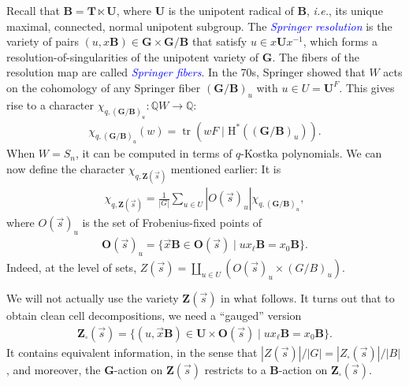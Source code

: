 \documentclass[submission]{FPSAC2025}
\newcommand{\dfemph}[1]{\textcolor{blue}{\emph{#1}}}
\DeclareMathOperator{\tr}{tr}
\newcommand{\CharQ}[1]{\chi_{q, #1}}
\begin{document}
Recall that $\mathbf{B} = \mathbf{T} \ltimes \mathbf{U}$, where $\mathbf{U}$ is the unipotent radical of $\mathbf{B}$, \emph{i.e.}, its unique maximal, connected, normal unipotent subgroup.
The \dfemph{Springer resolution} is the variety of pairs $(u, x\mathbf{B}) \in \mathbf{G} \times \mathbf{G}/\mathbf{B}$ that satisfy $u \in x\mathbf{U}x^{-1}$, which forms a resolution-of-singularities of the unipotent variety of $\mathbf{G}$.
The fibers of the resolution map are called \dfemph{Springer fibers}.
In the 70s, Springer showed that $W$ acts on the cohomology of any Springer fiber $(\mathbf{G}/\mathbf{B})_u$ with $u \in U = \mathbf{U}^F$.
This gives rise to a character $\CharQ{(\mathbf{G}/\mathbf{B})_u} : \mathbb{Q}W \to \mathbb{Q}$:
\begin{align}
\CharQ{(\mathbf{G}/\mathbf{B})_u}(w) = \tr(wF \mid \mathrm{H}^\ast((\mathbf{G}/\mathbf{B})_u)).
\end{align}
When $W = S_n$, it can be computed in terms of $q$-Kostka polynomials.
We can now define the character $\CharQ{\mathbf{Z}(\vec{s})}$ mentioned earlier:
It is
\begin{align}
\CharQ{\mathbf{Z}(\vec{s})} = \frac{1}{|G|}
	\sum_{u \in U} |O(\vec{s})_u|\CharQ{(\mathbf{G}/\mathbf{B})_u},
\end{align}
where $O(\vec{s})_u$ is the set of Frobenius-fixed points of
\begin{align}
\mathbf{O}(\vec{s})_u = \{\vec{x}\mathbf{B} \in \mathbf{O}(\vec{s}) \mid ux_\ell\mathbf{B} = x_0\mathbf{B}\}.
\end{align}
Indeed, at the level of sets, $Z(\vec{s}) = \coprod_{u \in U} {(O(\vec{s})_u \times (G/B)_u)}$.

We will not actually use the variety $\mathbf{Z}(\vec{s})$ in what follows.
It turns out that to obtain clean cell decompositions, we need a ``gauged'' version
\begin{align}
\mathbf{Z}_\square(\vec{s}) = \{(u, \vec{x}\mathbf{B}) \in \mathbf{U} \times \mathbf{O}(\vec{s}) \mid ux_\ell \mathbf{B} = x_0\mathbf{B}\}.
\end{align}
It contains equivalent information, in the sense that $|Z(\vec{s})|/|G| = |Z_\square(\vec{s})|/|B|$, and moreover, the $\mathbf{G}$-action on $\mathbf{Z}(\vec{s})$ restricts to a $\mathbf{B}$-action on $\mathbf{Z}_\square(\vec{s})$.
\end{document}
